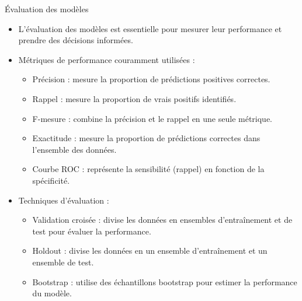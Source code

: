 \documentclass{beamer}
\begin{document}
\begin{frame}{Évaluation des modèles}
	\begin{itemize}
		\item L'évaluation des modèles est essentielle pour mesurer leur performance et prendre des décisions informées.
		\item Métriques de performance couramment utilisées :
		\begin{itemize}
			\item Précision : mesure la proportion de prédictions positives correctes.
			\item Rappel : mesure la proportion de vrais positifs identifiés.
			\item F-mesure : combine la précision et le rappel en une seule métrique.
			\item Exactitude : mesure la proportion de prédictions correctes dans l'ensemble des données.
			\item Courbe ROC : représente la sensibilité (rappel) en fonction de la spécificité.
		\end{itemize}
		\item Techniques d'évaluation :
		\begin{itemize}
			\item Validation croisée : divise les données en ensembles d'entraînement et de test pour évaluer la performance.
			\item Holdout : divise les données en un ensemble d'entraînement et un ensemble de test.
			\item Bootstrap : utilise des échantillons bootstrap pour estimer la performance du modèle.
		\end{itemize}
	\end{itemize}
\end{frame}

\end{document}

